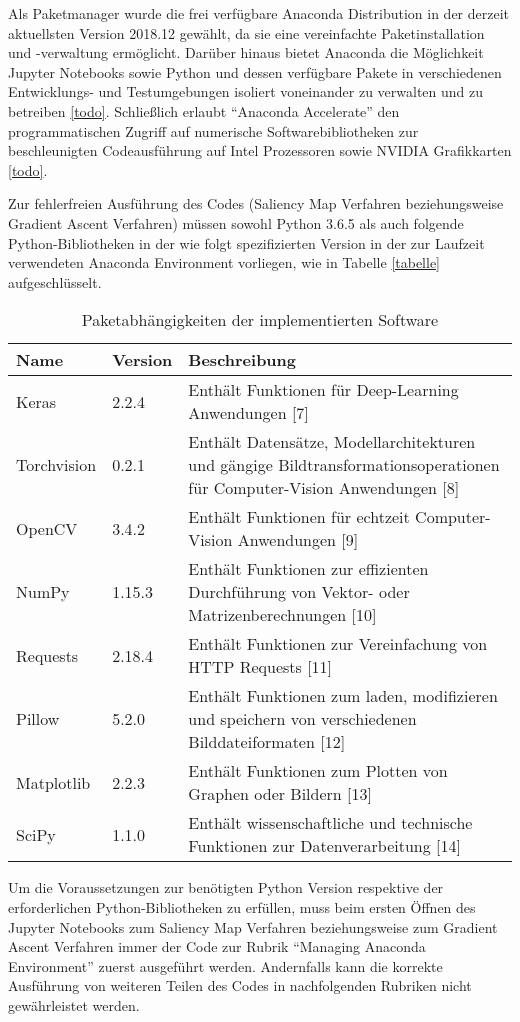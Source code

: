 Als Paketmanager wurde die frei verfügbare Anaconda Distribution in der derzeit aktuellsten Version 2018.12 gewählt, da sie eine vereinfachte Paketinstallation und -verwaltung ermöglicht. Darüber hinaus bietet Anaconda die Möglichkeit Jupyter Notebooks sowie Python und dessen verfügbare Pakete in verschiedenen Entwicklungs- und Testumgebungen isoliert voneinander zu verwalten und zu betreiben \ref{todo}. Schließlich erlaubt “Anaconda Accelerate” den programmatischen Zugriff auf numerische Softwarebibliotheken zur beschleunigten Codeausführung auf Intel Prozessoren sowie NVIDIA Grafikkarten \ref{todo}.


Zur fehlerfreien Ausführung des Codes (Saliency Map Verfahren beziehungsweise Gradient Ascent Verfahren) müssen sowohl Python 3.6.5 als auch folgende Python-Bibliotheken in der wie folgt spezifizierten Version in der zur Laufzeit verwendeten Anaconda Environment vorliegen, wie in Tabelle \ref{tabelle} aufgeschlüsselt.


\begin{table}
	\centering
\begin{tabular}{|l|l|p{10.4cm}|}
	\hline 
	Name & Version & Beschreibung \\ 
	\hline\hline 
	Keras& 2.2.4  & Enthält Funktionen für Deep-Learning Anwendungen [7] \\ 
	\hline 
	Torchvision& 0.2.1 & Enthält Datensätze, Modellarchitekturen und gängige Bildtransformationsoperationen für Computer-Vision Anwendungen [8] \\ 
	\hline 
	OpenCV& 3.4.2  & Enthält Funktionen für echtzeit Computer-Vision Anwendungen [9] \\ 
	\hline 
	NumPy&  1.15.3& Enthält Funktionen zur effizienten Durchführung von Vektor- oder Matrizenberechnungen [10] \\ 
	\hline 
	Requests& 2.18.4 & Enthält Funktionen zur Vereinfachung von HTTP Requests [11] \\ 
	\hline 
	Pillow& 5.2.0 & Enthält Funktionen zum laden, modifizieren und speichern von verschiedenen Bilddateiformaten [12] \\ 
	\hline 
	Matplotlib& 2.2.3 & Enthält Funktionen zum Plotten von Graphen oder Bildern [13] \\ 
	\hline 
	SciPy& 1.1.0  & Enthält wissenschaftliche und technische Funktionen zur Datenverarbeitung [14] \\ 
	\hline 
\end{tabular} 
	\caption{Paketabhängigkeiten der implementierten Software}
\label{tab:parameter}
\end{table}

Um die Voraussetzungen zur benötigten Python Version respektive der erforderlichen Python-Bibliotheken zu erfüllen, muss beim ersten Öffnen des Jupyter Notebooks zum Saliency Map Verfahren beziehungsweise zum Gradient Ascent Verfahren immer der Code zur Rubrik “Managing Anaconda Environment” zuerst ausgeführt werden. Andernfalls kann die korrekte Ausführung von weiteren Teilen des Codes in nachfolgenden Rubriken nicht gewährleistet werden.